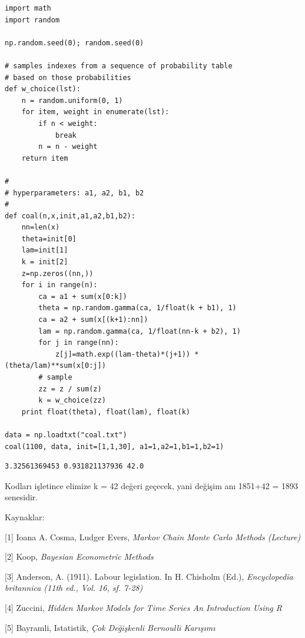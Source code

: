 \documentclass[12pt,fleqn]{article}\usepackage{../../common}
\begin{document}
\begin{verbatim}
import math
import random

np.random.seed(0); random.seed(0)

# samples indexes from a sequence of probability table
# based on those probabilities
def w_choice(lst):
    n = random.uniform(0, 1)
    for item, weight in enumerate(lst):
        if n < weight:
            break
        n = n - weight
    return item

#
# hyperparameters: a1, a2, b1, b2
#
def coal(n,x,init,a1,a2,b1,b2):
    nn=len(x)
    theta=init[0]
    lam=init[1]
    k = init[2]
    z=np.zeros((nn,))
    for i in range(n):
        ca = a1 + sum(x[0:k])
        theta = np.random.gamma(ca, 1/float(k + b1), 1) 
        ca = a2 + sum(x[(k+1):nn])
        lam = np.random.gamma(ca, 1/float(nn-k + b2), 1)
        for j in range(nn):
            z[j]=math.exp((lam-theta)*(j+1)) * (theta/lam)**sum(x[0:j])
        # sample
        zz = z / sum(z)
        k = w_choice(zz)
    print float(theta), float(lam), float(k)
                
data = np.loadtxt("coal.txt")
coal(1100, data, init=[1,1,30], a1=1,a2=1,b1=1,b2=1)
\end{verbatim}

\begin{verbatim}
3.32561369453 0.931821137936 42.0
\end{verbatim}

Kodları işletince elimize k = 42 değeri geçecek, yani değişim anı 1851+42 =
1893 senesidir. 

Kaynaklar: 

[1] Ioana A. Cosma, Ludger Evers, {\em Markov Chain Monte Carlo Methods (Lecture)}

[2] Koop, {\em Bayesian Econometric Methods}

[3] Anderson, A. (1911). Labour legislation. In H. Chisholm (Ed.),
{\em Encyclopedia britannica (11th ed., Vol. 16, sf. 7-28)}

[4] Zuccini, {\em Hidden Markov Models for Time Series An Introduction Using R}

[5] Bayramli, Istatistik, {\em Çok Değişkenli Bernoulli Karışımı}
\end{document}

